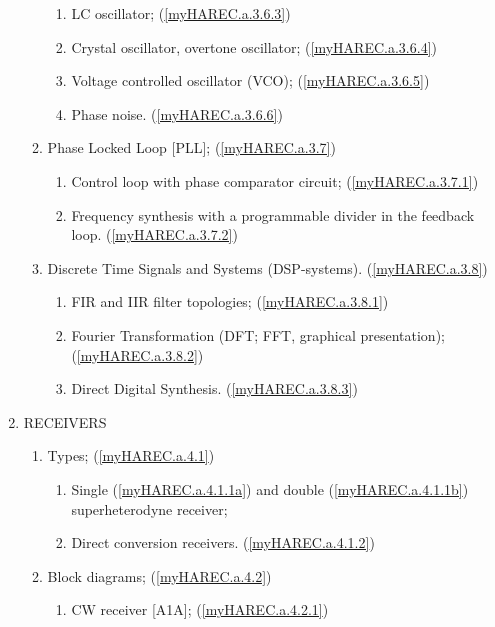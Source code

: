 \begin{enumerate}
\begin{enumerate}[noitemsep]
\begin{enumerate}[noitemsep]
\item LC oscillator; (\ref{myHAREC.a.3.6.3})\label{HAREC.a.3.6.3}
\item Crystal oscillator, overtone oscillator; (\ref{myHAREC.a.3.6.4})\label{HAREC.a.3.6.4}
\item Voltage controlled oscillator (VCO); (\ref{myHAREC.a.3.6.5})\label{HAREC.a.3.6.5}
\item Phase noise. (\ref{myHAREC.a.3.6.6})\label{HAREC.a.3.6.6}
\end{enumerate}
\item Phase Locked Loop [PLL]; (\ref{myHAREC.a.3.7})\label{HAREC.a.3.7}
\begin{enumerate}[noitemsep]
\item Control loop with phase comparator circuit; (\ref{myHAREC.a.3.7.1})\label{HAREC.a.3.7.1}
\item Frequency synthesis with a programmable divider in the feedback loop. (\ref{myHAREC.a.3.7.2})\label{HAREC.a.3.7.2}
\end{enumerate}
\item Discrete Time Signals and Systems (DSP-systems). (\ref{myHAREC.a.3.8})\label{HAREC.a.3.8}
\begin{enumerate}[noitemsep]
\item FIR and IIR filter topologies; (\ref{myHAREC.a.3.8.1})\label{HAREC.a.3.8.1}
\item Fourier Transformation (DFT; FFT, graphical presentation); (\ref{myHAREC.a.3.8.2})\label{HAREC.a.3.8.2}
\item Direct Digital Synthesis. (\ref{myHAREC.a.3.8.3})\label{HAREC.a.3.8.3}
\end{enumerate}
\end{enumerate}
\item RECEIVERS
\begin{enumerate}[noitemsep]
\item Types; (\ref{myHAREC.a.4.1})\label{HAREC.a.4.1}
\begin{enumerate}[noitemsep]
\item Single (\ref{myHAREC.a.4.1.1a})\label{HAREC.a.4.1.1a} and double (\ref{myHAREC.a.4.1.1b})\label{HAREC.a.4.1.1b} superheterodyne receiver;
\item Direct conversion receivers. (\ref{myHAREC.a.4.1.2})\label{HAREC.a.4.1.2}
\end{enumerate}
\item Block diagrams; (\ref{myHAREC.a.4.2})\label{HAREC.a.4.2}
\begin{enumerate}[noitemsep]
\item CW receiver [A1A]; (\ref{myHAREC.a.4.2.1})\label{HAREC.a.4.2.1}

\end{enumerate}
\end{enumerate}
\end{enumerate}
